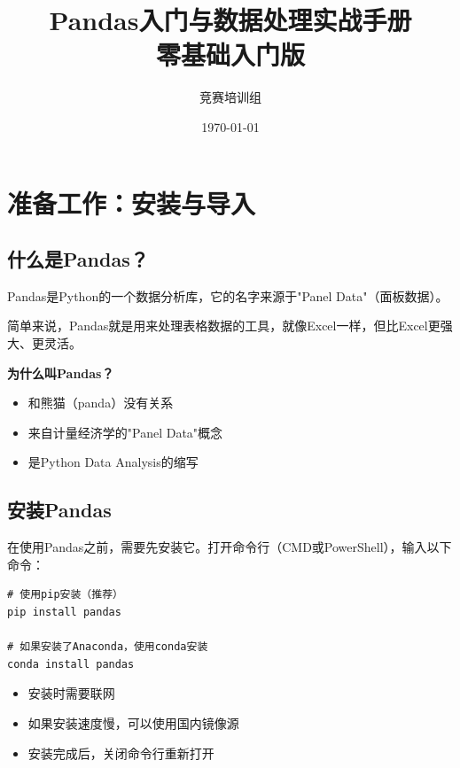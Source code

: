 \documentclass[12pt,a4paper]{article}
\title{\textbf{Pandas入门与数据处理实战手册}\\[0.5em]\large 零基础入门版}
\author{竞赛培训组}
\date{\today}
\begin{document}
\maketitle
\tableofcontents
\newpage

\section{准备工作：安装与导入}

\subsection{什么是Pandas？}

\begin{knowledgebox}
Pandas是Python的一个数据分析库，它的名字来源于"Panel Data"（面板数据）。

简单来说，Pandas就是用来处理表格数据的工具，就像Excel一样，但比Excel更强大、更灵活。

\textbf{为什么叫Pandas？}
\begin{itemize}
    \item 和熊猫（panda）没有关系
    \item 来自计量经济学的"Panel Data"概念
    \item 是Python Data Analysis的缩写
\end{itemize}
\end{knowledgebox}

\subsection{安装Pandas}

在使用Pandas之前，需要先安装它。打开命令行（CMD或PowerShell），输入以下命令：

\begin{lstlisting}[caption={安装Pandas}]
# 使用pip安装（推荐）
pip install pandas

# 如果安装了Anaconda，使用conda安装
conda install pandas
\end{lstlisting}

\begin{tipbox}[安装小贴士]
\begin{itemize}
    \item 安装时需要联网
    \item 如果安装速度慢，可以使用国内镜像源
    \item 安装完成后，关闭命令行重新打开
\end{itemize}
\end{tipbox}
\end{document}
